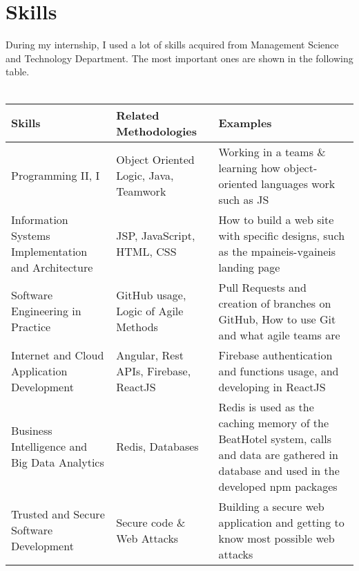 
\chapter{Skills} %

\label{Chapter6}

During my internship, I used a lot of skills acquired from Management Science and Technology Department. The most important ones are shown in the following table. \\ \\

\begin{center}
	\begin{tabular}{ | p{4cm} | p{5cm} | p{5cm} |}
		\hline
		\textbf{Skills}					
						& \textbf{Related Methodologies} 
										& \textbf{Examples}	\\[0.5cm] \hline
		
		Programming II, I 					
						& Object Oriented Logic, Java, Teamwork
										& Working in a teams \& learning how object-oriented languages work such as JS\\[0.2cm] \hline
		Information Systems Implementation 
		 and Architecture 					
		 				& JSP, JavaScript, HTML, CSS 
		 								& How to build a web site with specific designs, such as the mpaineis-vgaineis landing page \\[0.2cm] \hline
		Software Engineering in Practice 	
						& GitHub usage, Logic of Agile Methods
										& Pull Requests and creation of branches on GitHub,
										How to use Git and what agile teams are  \\[0.2cm] \hline	
		Internet and 
			Cloud Application Development 	
						& Angular, Rest APIs, Firebase, ReactJS
										& Firebase authentication and functions usage, and developing in ReactJS \\[0.2cm] \hline	
		Business Intelligence and 
		 Big Data Analytics 				
		 				& Redis, Databases 
		 								& Redis is used as the caching memory of the BeatHotel system, calls and data are gathered in database and used in the developed npm packages\\[0.2cm] \hline
		Trusted and 
			Secure Software Development		
						& Secure code \& Web Attacks 
										& Building a secure web application and getting to know most possible web attacks \\[0.2cm] \hline
	\end{tabular}
\end{center}

